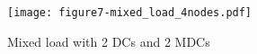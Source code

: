 \begin{figure}[tb]
  \begin{center}
    \texttt{[image: figure7-mixed\_load\_4nodes.pdf]}
    \vspace{-4.0ex}
    \caption{Mixed load with 2 DCs and 2 MDCs}
    \label{fig:mixed}
  \end{center}
\end{figure}







